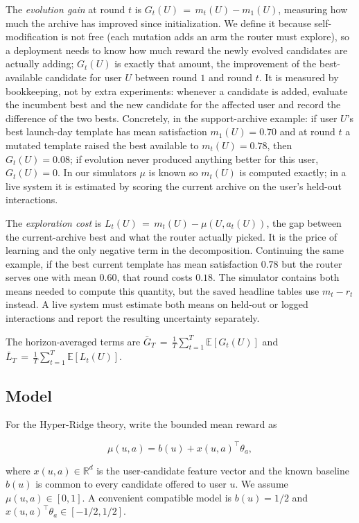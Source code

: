 \documentclass{article} %
\providecommand{\E}{\mathbb{E}}
\begin{document}
The \emph{evolution gain} at round $t$ is $G_t(U) \,=\, m_t(U) - m_1(U)$, measuring how much the archive has improved since initialization. We define it because self-modification is not free (each mutation adds an arm the router must explore), so a deployment needs to know how much reward the newly evolved candidates are actually adding; $G_t(U)$ is exactly that amount, the improvement of the best-available candidate for user $U$ between round $1$ and round $t$. It is measured by bookkeeping, not by extra experiments: whenever a candidate is added, evaluate the incumbent best and the new candidate for the affected user and record the difference of the two bests. Concretely, in the support-archive example: if user $U$'s best launch-day template has mean satisfaction $m_1(U) = 0.70$ and at round $t$ a mutated template raised the best available to $m_t(U) = 0.78$, then $G_t(U) = 0.08$; if evolution never produced anything better for this user, $G_t(U) = 0$. In our simulators $\mu$ is known so $m_t(U)$ is computed exactly; in a live system it is estimated by scoring the current archive on the user's held-out interactions.

The \emph{exploration cost} is $L_t(U) \,=\, m_t(U) - \mu(U, a_t(U))$, the gap between the current-archive best and what the router actually picked. It is the price of learning and the only negative term in the decomposition. Continuing the same example, if the best current template has mean satisfaction $0.78$ but the router serves one with mean $0.60$, that round costs $0.18$. The simulator contains both means needed to compute this quantity, but the saved headline tables use \(m_t-r_t\) instead. A live system must estimate both means on held-out or logged interactions and report the resulting uncertainty separately.


The horizon-averaged terms are $\bar G_T \,=\, \frac{1}{T}\sum_{t=1}^T \E[G_t(U)]$ and $\bar L_T \,=\, \frac{1}{T}\sum_{t=1}^T \E[L_t(U)]$.

\subsection{Model}
\label{sec:method-model}

For the Hyper-Ridge theory, write the bounded mean reward as

\[
\mu(u,a)=b(u)+x(u,a)^\top\theta_a ,
\]

where $x(u,a)\in\mathbb{R}^d$ is the user-candidate feature vector and the known baseline $b(u)$ is common to every candidate offered to user $u$. We assume $\mu(u,a)\in[0,1]$. A convenient compatible model is $b(u)=1/2$ and $x(u,a)^\top\theta_a\in[-1/2,1/2]$.
\end{document}
